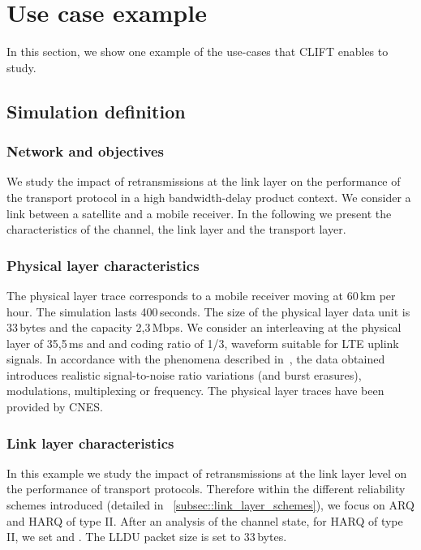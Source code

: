 \documentclass[conference,letterpaper]{IEEEtran}
\begin{document}
\section{Use case example}
\label{sec::illustration}

In this section, we show one example of the use-cases that CLIFT enables to study.
\subsection{Simulation definition}
\label{subsec::illustration_definition}

\subsubsection{Network and objectives}
We study the impact of retransmissions at the link layer on the performance of the transport protocol in a high bandwidth-delay product context. We consider a link between a satellite and a mobile receiver. In the following we present the characteristics of the channel, the link layer and the transport layer.

\subsubsection{Physical layer characteristics}
The physical layer trace corresponds to a mobile receiver moving at 60\,km per hour. The simulation lasts 400\,seconds. The size of the physical layer data unit is 33\,bytes and the capacity 2,3\,Mbps. We consider an interleaving at the physical layer of 35,5\,ms and and coding ratio of 1/3, waveform suitable for LTE uplink signals. In accordance with the phenomena described in~\cite{lms_state}, the data obtained introduces realistic signal-to-noise ratio variations (and burst erasures), modulations, multiplexing or frequency. The physical layer traces have been provided by CNES.

\subsubsection{Link layer characteristics}
In this example we study the impact of retransmissions at the link layer level on the performance of transport protocols. Therefore within the different reliability schemes introduced (detailed in ~\ref{subsec::link_layer_schemes}), we focus on ARQ and HARQ of type II. After an analysis of the channel state, for HARQ of type II, we set  and . The LLDU packet size is set to 33\,bytes.
\end{document}

